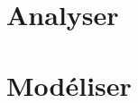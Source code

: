 \documentclass[10pt,fleqn]{book} %
\newcommand{\repStyle}{../../Style}
\begin{document}
\def\xxcompetences{}
\def\xxfigures{}

\graphicspath{{\repStyle/png/}}



\setlength{\columnseprule}{.1pt}

\chapter{Analyser}


\pagestyle{fancy}
\thispagestyle{plain}


\chapter{Modéliser}


\pagestyle{fancy}
\thispagestyle{plain}



%
%


\newpage
\printindex
\end{document}

